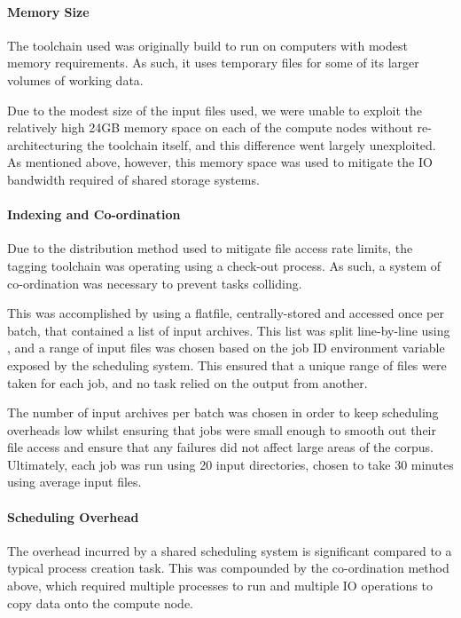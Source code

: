 \paragraph{Memory Size}
The toolchain used was originally build to run on computers with modest memory requirements.  As such, it uses temporary files for some of its larger volumes of working data.

Due to the modest size of the input files used, we were unable to exploit the relatively high 24GB memory space on each of the compute nodes without re-architecturing the toolchain itself, and this difference went largely unexploited.  As mentioned above, however, this memory space was used to mitigate the IO bandwidth required of shared storage systems.






\paragraph{Indexing and Co-ordination}
Due to the distribution method used to mitigate file access rate limits, the tagging toolchain was operating using a check-out process.  As such, a system of co-ordination was necessary to prevent tasks colliding.

This was accomplished by using a flatfile, centrally-stored and accessed once per batch, that contained a list of input archives.  This list was split line-by-line using , and a range of input files was chosen based on the job ID environment variable exposed by the scheduling system.  This ensured that a unique range of files were taken for each job, and no task relied on the output from another.

The number of input archives per batch was chosen in order to keep scheduling overheads low whilst ensuring that jobs were small enough to smooth out their file access and ensure that any failures did not affect large areas of the corpus.  Ultimately, each job was run using 20 input directories, chosen to take 30 minutes using average input files.


\paragraph{Scheduling Overhead}
The overhead incurred by a shared scheduling system is significant compared to a typical process creation task.  This was compounded by the co-ordination method above, which required multiple processes to run and multiple IO operations to copy data onto the compute node.

